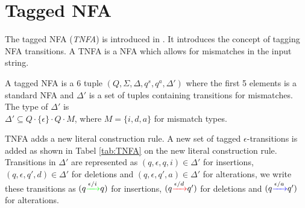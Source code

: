 \section{Tagged NFA}
\label{sec:tnfa}
The tagged NFA (\emph{TNFA}) is introduced in \cite{Ville}. It introduces the concept of tagging NFA transitions. A TNFA is a NFA which allows for mismatches in the input string.

\begin{mydef}
A tagged NFA is a 6 tuple $(Q,\Sigma,\Delta,q^s,q^a,\Delta')$ where the first 5 elements is a standard NFA and $\Delta'$ is a set of tuples containing transitions for mismatches. The type of $\Delta'$ is \\$\Delta' \subseteq Q \cdot\{\epsilon\} \cdot Q \cdot M$, where $M = \{i,d,a\}$ for mismatch types.  
\end{mydef}
TNFA adds a new literal construction rule. A new set of tagged $\epsilon$-transitions is added as shown in Tabel \ref{tab:TNFA} on the new literal construction rule. Transitions in $\Delta'$ are represented as $(q,\epsilon,q,i) \in \Delta'$ for insertions,$(q,\epsilon,q',d) \in \Delta'$ for deletions and $(q,\epsilon,q',a) \in \Delta'$ for alterations, we write these transitions as $(q {\color{green} \xrightarrow{{\color{black}\epsilon/i}}} q)$ for insertions, $(q {\color{red} \xrightarrow{{\color{black}\epsilon/d}}} q')$ for deletions and $(q {\color{blue} \xrightarrow{{\color{black}\epsilon/a}}} q')$ for alterations.
